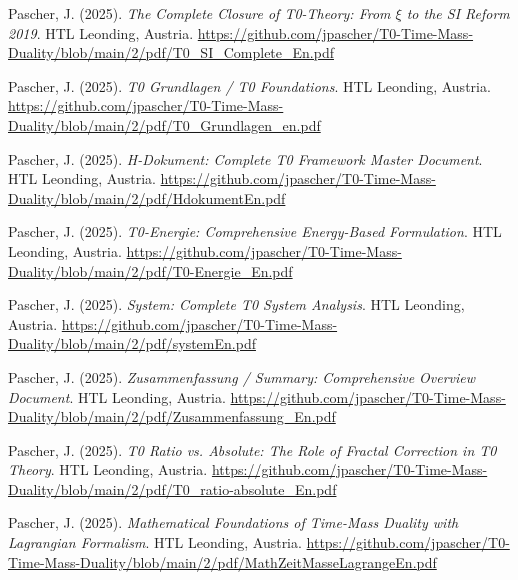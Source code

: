 \documentclass{article}
\begin{document}
	\begin{thebibliography}{99}
		
		Pascher, J. (2025).
		\textit{The Complete Closure of T0-Theory: From $\xi$ to the SI Reform 2019}.
		HTL Leonding, Austria.
		\url{https://github.com/jpascher/T0-Time-Mass-Duality/blob/main/2/pdf/T0_SI_Complete_En.pdf}
		
		Pascher, J. (2025).
		\textit{T0 Grundlagen / T0 Foundations}.
		HTL Leonding, Austria.
		\url{https://github.com/jpascher/T0-Time-Mass-Duality/blob/main/2/pdf/T0_Grundlagen_en.pdf}
		
		Pascher, J. (2025).
		\textit{H-Dokument: Complete T0 Framework Master Document}.
		HTL Leonding, Austria.
		\url{https://github.com/jpascher/T0-Time-Mass-Duality/blob/main/2/pdf/HdokumentEn.pdf}
		
		Pascher, J. (2025).
		\textit{T0-Energie: Comprehensive Energy-Based Formulation}.
		HTL Leonding, Austria.
		\url{https://github.com/jpascher/T0-Time-Mass-Duality/blob/main/2/pdf/T0-Energie_En.pdf}
		
		Pascher, J. (2025).
		\textit{System: Complete T0 System Analysis}.
		HTL Leonding, Austria.
		\url{https://github.com/jpascher/T0-Time-Mass-Duality/blob/main/2/pdf/systemEn.pdf}
		
		Pascher, J. (2025).
		\textit{Zusammenfassung / Summary: Comprehensive Overview Document}.
		HTL Leonding, Austria.
		\url{https://github.com/jpascher/T0-Time-Mass-Duality/blob/main/2/pdf/Zusammenfassung_En.pdf}
		
		Pascher, J. (2025).
		\textit{T0 Ratio vs. Absolute: The Role of Fractal Correction in T0 Theory}.
		HTL Leonding, Austria.
		\url{https://github.com/jpascher/T0-Time-Mass-Duality/blob/main/2/pdf/T0_ratio-absolute_En.pdf}
		
		
		Pascher, J. (2025).
		\textit{Mathematical Foundations of Time-Mass Duality with Lagrangian Formalism}.
		HTL Leonding, Austria.
		\url{https://github.com/jpascher/T0-Time-Mass-Duality/blob/main/2/pdf/MathZeitMasseLagrangeEn.pdf}
		

\end{thebibliography}
\end{document}

